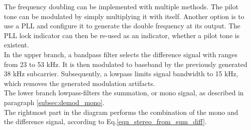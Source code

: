 The frequency doubling can be implemented with multiple methods.
The pilot tone can be modulated by simply multiplying it with itself.
Another option is to use a PLL and configure it to generate the double frequency at its output.
The PLL lock indicator can then be re-used as an indicator, whether a pilot tone is existent.\\

In the upper branch, a bandpass filter selects the difference signal with ranges from 23 to 53 kHz.
It is then modulated to baseband by the previously generated 38 kHz subcarrier.
Subsequently, a lowpass limits signal bandwidth to 15 kHz, which removes the generated modulation artifacts.\\

The lower branch lowpass-filters the summation, or mono signal, as described in paragraph \ref{subsec:demod_mono}.\\

The rightmost part in the diagram performs the combination of the mono and the difference signal, according to Eq.\eqref{equ_stereo_from_sum_diff}.
